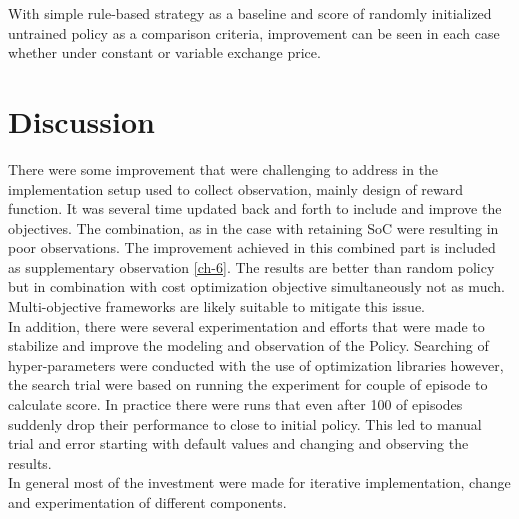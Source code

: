 \begin{large}
With simple rule-based strategy as a baseline and score of randomly initialized untrained policy as a comparison criteria, improvement can be seen in each case whether under constant or variable exchange price. \\

\section{Discussion}


There were some improvement that were challenging to address in the implementation setup used to collect observation, mainly design of reward function. It was several time updated back and forth to include and improve the objectives. The combination, as in the case with retaining SoC were resulting in poor observations. The improvement achieved in this combined part is included as supplementary observation \ref{ch-6}. The results are better than random policy but in combination with cost optimization objective simultaneously not as much. Multi-objective frameworks are likely suitable to mitigate this issue. \\

In addition, there were several experimentation and efforts that were made to stabilize and improve the modeling and observation of the Policy. Searching of hyper-parameters were conducted with the use of optimization libraries however, the search trial were based on running the experiment for couple of episode to calculate score. In practice there were runs that even after 100 of episodes suddenly drop their performance to close to initial policy. This led to manual trial and error starting with default values and changing and observing the results. \\

In general most of the investment were made for iterative  implementation, change and experimentation of different components. 

\end{large}

